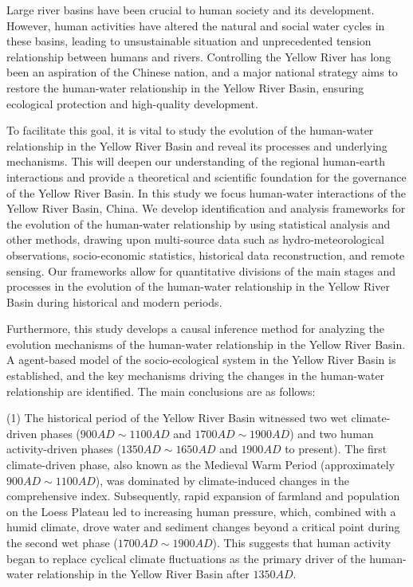 \begin{eabstract}
  Large river basins have been crucial to human society and its development. However, human activities have altered the natural and social water cycles in these basins, leading to unsustainable situation and unprecedented tension relationship between humans and rivers. Controlling the Yellow River has long been an aspiration of the Chinese nation, and a major national strategy aims to restore the human-water relationship in the Yellow River Basin, ensuring ecological protection and high-quality development.

  To facilitate this goal, it is vital to study the evolution of the human-water relationship in the Yellow River Basin and reveal its processes and underlying mechanisms. This will deepen our understanding of the regional human-earth interactions and provide a theoretical and scientific foundation for the governance of the Yellow River Basin. In this study we focus human-water interactions of the Yellow River Basin, China. We develop identification and analysis frameworks for the evolution of the human-water relationship by using statistical analysis and other methods, drawing upon multi-source data such as hydro-meteorological observations, socio-economic statistics, historical data reconstruction, and remote sensing. Our frameworks allow for quantitative divisions of the main stages and processes in the evolution of the human-water relationship in the Yellow River Basin during historical and modern periods.
  
  Furthermore, this study develops a causal inference method for analyzing the evolution mechanisms of the human-water relationship in the Yellow River Basin. A agent-based model of the socio-ecological system in the Yellow River Basin is established, and the key mechanisms driving the changes in the human-water relationship are identified. The main conclusions are as follows:

  (1) The historical period of the Yellow River Basin witnessed two wet climate-driven phases ($900 AD \sim 1100 AD$ and $1700 AD \sim 1900 AD$) and two human activity-driven phases ($1350 AD \sim 1650 AD$ and $1900 AD$ to present). The first climate-driven phase, also known as the Medieval Warm Period (approximately $900 AD \sim 1100 AD$), was dominated by climate-induced changes in the comprehensive index. Subsequently, rapid expansion of farmland and population on the Loess Plateau led to increasing human pressure, which, combined with a humid climate, drove water and sediment changes beyond a critical point during the second wet phase ($1700 AD \sim 1900 AD$). This suggests that human activity began to replace cyclical climate fluctuations as the primary driver of the human-water relationship in the Yellow River Basin after $1350 AD$.


\end{eabstract}
